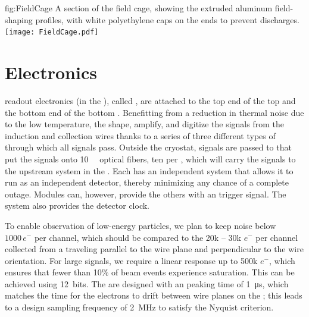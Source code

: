 \begin{dunefigure}{fig:FieldCage}
{A section of the field cage, showing the extruded aluminum field-shaping profiles, with white polyethylene caps on the ends to prevent discharges.}
\texttt{[image: FieldCage.pdf]}
\end{dunefigure}

\section{Electronics}
\label{sec:exec-sp-electronics}

 readout electronics (in the ), called , are attached to the top end of the top  and the bottom end of the bottom . 
Benefitting from a reduction in thermal noise due to the low temperature, the   
shape, amplify, and digitize the signals from the  induction and collection wires thanks to a series of three different types of  through which all signals pass. 
Outside the cryostat, signals are passed to  that put the signals onto \SI{10}{\giga\byte} optical fibers, ten per , which will carry the signals to the upstream  system in the . Each  has an independent  system that allows it to run as an independent detector, thereby minimizing any chance of a complete  outage. Modules can, however, provide the others with an  trigger signal. The  system also provides the detector clock. 

To enable observation of low-energy particles, we plan to keep noise below $1000\,e^{-}$ per channel, which should be compared to the 20k -- 30k $e^{-}$ per channel collected from a  traveling parallel to the wire plane and perpendicular to the wire orientation. For large signals, we require a linear response up to 500k $e^{-}$, which ensures that fewer than 10\% of beam events experience saturation. This can be achieved using 12\,  bits. %
The  are designed with an  peaking time of \SI{1}{\micro\second}, which matches the time for the electrons to drift between wire planes on the ; this leads to a design sampling frequency of \SI{2}{\mega\hertz} to satisfy the Nyquist criterion.

